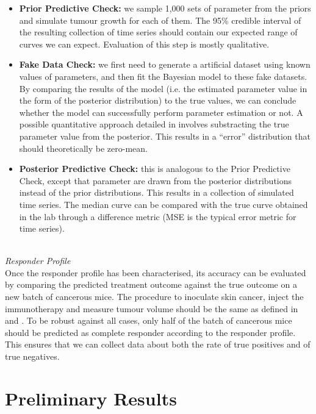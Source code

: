 \documentclass[11pt]{article}
\begin{document}
\begin{itemize}
    \item \textbf{Prior Predictive Check:} we sample 1,000 sets of parameter from the priors and simulate tumour growth for each of them. The 95\% credible interval of the resulting collection of time series should contain our expected range of curves we can expect. Evaluation of this step is mostly qualitative.
    \item \textbf{Fake Data Check:} we first need to generate a artificial dataset using known values of parameters, and then fit the Bayesian model to these fake datasets. By comparing the results of the model (i.e. the estimated parameter value in the form of the posterior distribution) to the true values, we can conclude whether the model can successfully perform parameter estimation or not. A possible quantitative approach detailed in \cite{rosenbaum} involves substracting the true parameter value from the posterior. This results in a ``error'' distribution that should theoretically be zero-mean.
    \item \textbf{Posterior Predictive Check:} this is analogous to the Prior Predictive Check, except that parameter are drawn from the posterior distributions instead of the prior distributions. This results in a collection of simulated time series. The median curve can be compared with the true curve obtained in the lab through a difference metric (MSE is the typical error metric for time series). 
\end{itemize}
~\\[11pt]
%

\textit{Responder Profile}\\[3pt]
Once the responder profile has been characterised, its accuracy can be evaluated by comparing the predicted treatment outcome against the true outcome on a new batch of cancerous mice. The procedure to inoculate skin cancer, inject the immunotherapy and measure tumour volume should be the same as defined in \cite{cbdil12} and \cite{takuya}. To be robust against all cases, only half of the batch of cancerous mice should be predicted as complete responder according to the responder profile. This ensures that we can collect data about both the rate of true positives and of true negatives.

\section{Preliminary Results}
\end{document}
